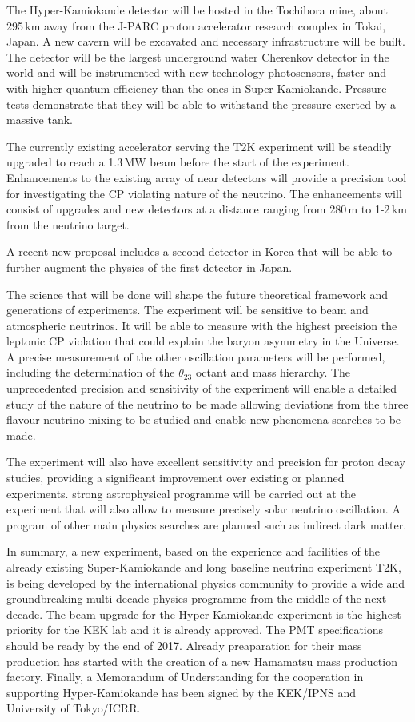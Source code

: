 \documentclass[11pt]{article}
\begin{document}
The Hyper-Kamiokande detector will be hosted in the Tochibora mine,
about 295\,km away from the J-PARC proton accelerator research complex
in Tokai, Japan. A new cavern will be excavated and necessary
infrastructure will be built. The detector will be the largest
underground water Cherenkov detector in the world and will be
instrumented with new technology photosensors, faster and with higher
quantum efficiency than the ones in Super-Kamiokande. Pressure tests
demonstrate that they will be able to withstand the pressure exerted
by a massive tank.

The currently existing accelerator serving the T2K experiment will be
steadily upgraded to reach a 1.3\,MW beam before the start of the
experiment. Enhancements to the existing array of near detectors will
provide a precision tool for investigating the CP violating nature of
the neutrino. The enhancements will consist of upgrades and new
detectors at a distance ranging from 280\,m to 1-2\,km from the
neutrino target.

A recent new proposal includes a second detector in Korea that will be
able to further augment the physics of the first detector in Japan.

The science that will be done will shape the future theoretical
framework and generations of experiments. The experiment will be
sensitive to beam and atmospheric neutrinos. It will be able to
measure with the highest precision the leptonic CP violation that
could explain the baryon asymmetry in the Universe. A precise
measurement of the other oscillation parameters will be performed,
including the determination of the $\theta_{23}$ octant and mass
hierarchy.  The unprecedented precision and sensitivity of the
experiment will enable a detailed study of the nature of the neutrino
to be made allowing deviations from the three flavour neutrino mixing
to be studied and enable new phenomena searches to be made.

The experiment will also have excellent sensitivity and precision for
proton decay studies, providing a significant improvement over
existing or planned experiments. strong astrophysical programme will
be carried out at the experiment that will also allow to measure
precisely solar neutrino oscillation. A program of other main physics
searches are planned such as indirect dark matter.

In summary, a new experiment, based on the experience and facilities
of the already existing Super-Kamiokande and long baseline neutrino
experiment T2K, is being developed by the international physics
community to provide a wide and groundbreaking multi-decade physics
programme from the middle of the next decade.  The beam upgrade for
the Hyper-Kamiokande experiment is the highest priority for the KEK
lab and it is already approved. The PMT specifications should be ready
by the end of 2017. Already preaparation for their mass production has
started with the creation of a new Hamamatsu mass production 
factory. Finally, a Memorandum of Understanding for the cooperation in
supporting Hyper-Kamiokande has been signed by the KEK/IPNS and
University of Tokyo/ICRR.
\end{document}
